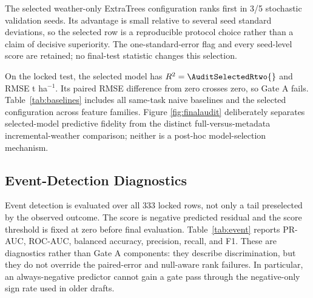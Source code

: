 \documentclass[conference]{IEEEtran}
\begin{document}
The selected weather-only ExtraTrees configuration ranks first in 3/5 stochastic
validation seeds. Its advantage is small relative to several seed standard
deviations, so the selected row is a reproducible protocol choice rather than a
claim of decisive superiority. The one-standard-error flag and every seed-level
score are retained; no final-test statistic changes this selection.

\begin{table}[t]
\centering
\caption{Validation stability of the leading configurations. The rank probability
is across fixed stochastic seeds; 1-SE denotes inclusion under the pre-specified
one-standard-error diagnostic, not a post-hoc replacement.}
\label{tab:stability}
\scriptsize
\resizebox{\columnwidth}{!}{}
\end{table}

On the locked test, the selected model has $R^2=\AuditSelectedRtwo{}$ and RMSE
\AuditSelectedRMSE{} t ha$^{-1}$. Its paired RMSE difference from zero crosses
zero, so Gate A fails. Table~\ref{tab:baselines} includes all same-task naive
baselines and the selected configuration across feature families. Figure
\ref{fig:finalaudit} deliberately separates selected-model predictive fidelity
from the distinct full-versus-metadata incremental-weather comparison; neither is
a post-hoc model-selection mechanism.

\begin{table}[t]
\centering
\caption{Locked 2016--2025 same-task audit. Learned-model predictions are seed
aggregated. $\Delta$RMSE is model minus zero-residual RMSE with paired 95\%
year-block intervals; RMSE is t ha$^{-1}$.}
\label{tab:baselines}
\scriptsize
\resizebox{\textwidth}{!}{}
\end{table}

\subsection{Event-Detection Diagnostics}
Event detection is evaluated over all 333 locked rows, not only a tail preselected
by the observed outcome. The score is negative predicted residual and the score
threshold is fixed at zero before final evaluation. Table~\ref{tab:event} reports
PR-AUC, ROC-AUC, balanced accuracy, precision, recall, and F1. These are
diagnostics rather than Gate A components: they describe discrimination, but they
do not override the paired-error and null-aware rank failures. In particular, an
always-negative predictor cannot gain a gate pass through the negative-only sign
rate used in older drafts.
\end{document}
